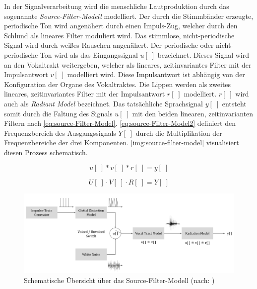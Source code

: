 In der Signalverarbeitung wird die menschliche Lautproduktion durch das sogenannte \emph{Source-Filter-Modell} modelliert. Der durch die Stimmbänder erzeugte, periodische Ton wird angenähert durch einen Impuls-Zug, welcher durch den Schlund als lineares Filter moduliert wird. Das stimmlose, nicht-periodische Signal wird durch weißes Rauschen angenähert. Der periodische oder nicht-periodische Ton wird als das Eingangssignal $u[\;]$ bezeichnet. Dieses Signal wird an den Vokaltrakt weitergeben, welcher als lineares, zeitinvariantes Filter mit der Impulsantwort $v[\;]$ modelliert wird. Diese Impulsantwort ist abhängig von der Konfiguration der Organe des Vokaltraktes. Die Lippen werden als zweites lineares, zeitinvariantes Filter mit der Impulsantwort $r[\;]$ modelliert. $r[\;]$ wird auch als \emph{Radiant Model} bezeichnet. Das tatsächliche Sprachsignal $y[\;]$ entsteht somit durch die Faltung des Signals $u[\;]$ mit den beiden linearen, zeitinvarianten Filtern nach \autoref{eq:source-Filter-Model}. \autoref{eq:source-Filter-Model2} definiert den Frequenzbereich des Ausgangssignals $Y[\;]$ durch die Multiplikation der Frequenzbereiche der drei Komponenten.\cite[S. 62 - 63]{cryModel} \cite{speechProduction} \autoref{img:source-filter-model} visualisiert diesen Prozess schematisch.

\begin{equation}
u[\;] * v[\;] * r[\;] = y[\;] 
\label{eq:source-Filter-Model}
\end{equation}

\begin{equation}
U[\;] \cdot V[\;] \cdot R[\;] = Y[\;] 
\label{eq:source-Filter-Model2}
\end{equation}

\begin{figure}[H]
	\centering
	\includegraphics[width=1\textwidth]{bilder/source-filter-model.png}
	\caption[Schematische Übersicht über das Source-Filter-Modell]{Schematische Übersicht über das Source-Filter-Modell (nach: \cite[ \emph{Source estimation}, S. 17]{ricardo_ceps})}
	\label{img:source-filter-model}
\end{figure}	

